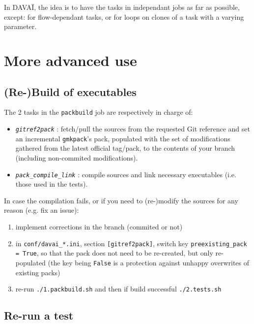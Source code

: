 \documentclass[a4paper,10pt,twoside]{article}
\begin{document}
In DAVAÏ, the idea is to have the tasks in independant jobs as far as possible, except: for flow-dependant tasks, or for loops on clones of a task with a varying parameter.








\newpage
\section{More advanced use\label{sect:options}}

\subsection{(Re-)Build of executables}
The 2 tasks in the \texttt{packbuild} job are respectively in charge of:
\begin{itemize}
 \item \texttt{\textit{gitref2pack}} : fetch/pull the sources from the requested Git reference and set an incremental \texttt{gmkpack}'s pack, populated with the set of modifications gathered from the latest official tag/pack, to the contents of your branch (including non-commited modifications).
 \item \texttt{\textit{pack\_compile\_link}} : compile sources and link necessary executables (i.e. those used in the tests).
\end{itemize}

\noindent In case the compilation fails, or if you need to (re-)modify the sources for any reason (e.g. fix an issue):
\begin{enumerate}[label=\arabic*.]
  \item implement corrections in the branch (commited or not)
  \item in \texttt{conf/davai\_*.ini}, section \texttt{[gitref2pack]}, switch key \texttt{preexisting\_pack = True}, so that the pack does not need to be re-created, but only re-populated (the key being \texttt{False} is a protection against unhappy overwrites of existing packs)
  \item re-run \texttt{./1.packbuild.sh} and then if build successful \texttt{./2.tests.sh}
 \end{enumerate}


\subsection{Re-run a test}
\end{document}
